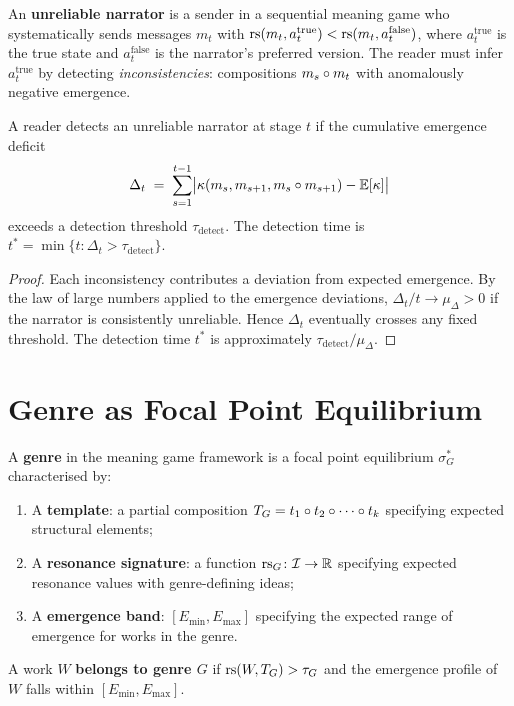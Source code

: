\begin{definition}
\label{def:unreliable}
An \textbf{unreliable narrator} is a sender in a sequential
meaning game who systematically sends messages $m_t$ with
$\mathrm{rs}(m_t, a_t^{\mathrm{true}}) < \mathrm{rs}(m_t, a_t^{\mathrm{false}})$,
where $a_t^{\mathrm{true}}$ is the true state and $a_t^{\mathrm{false}}$
is the narrator's preferred version.  The reader must infer
$a_t^{\mathrm{true}}$ by detecting \emph{inconsistencies}:
compositions $m_s \circ m_t$ with anomalously negative emergence.
\end{definition}

\begin{proposition}
\label{prop:unreliable-detection}
A reader detects an unreliable narrator at stage $t$ if
the cumulative emergence deficit
\[
  \Delta_t \;=\; \sum_{s=1}^{t-1} \bigl|
  \kappa(m_s, m_{s+1}, m_s \circ m_{s+1})
  - \mathbb{E}[\kappa]\bigr|
\]
exceeds a detection threshold $\tau_{\mathrm{detect}}$.  The
detection time is $t^* = \min\{t : \Delta_t > \tau_{\mathrm{detect}}\}$.
\end{proposition}

\begin{proof}
Each inconsistency contributes a deviation from expected emergence.
By the law of large numbers applied to the emergence deviations,
$\Delta_t / t \to \mu_\Delta > 0$ if the narrator is consistently
unreliable.  Hence $\Delta_t$ eventually crosses any fixed threshold.
The detection time $t^*$ is approximately
$\tau_{\mathrm{detect}} / \mu_\Delta$.
\end{proof}

\section{Genre as Focal Point Equilibrium}
\label{sec:genre}

\begin{definition}[Genre]
\label{def:genre}
A \textbf{genre} in the meaning game framework is a focal point
equilibrium $\sigma^*_G$ characterised by:
\begin{enumerate}[label=(\roman*)]
  \item A \textbf{template}: a partial composition
    $T_G = t_1 \circ t_2 \circ \cdots \circ t_k$ specifying
    expected structural elements;
  \item A \textbf{resonance signature}: a function $\mathrm{rs}_G \colon \mathcal{I} \to \mathbb{R}$
    specifying expected resonance values with genre-defining ideas;
  \item A \textbf{emergence band}: $[E_{\min}, E_{\max}]$ specifying
    the expected range of emergence for works in the genre.
\end{enumerate}
A work $W$ \textbf{belongs to genre $G$} if
$\mathrm{rs}(W, T_G) > \tau_G$ and the emergence profile of $W$ falls
within $[E_{\min}, E_{\max}]$.
\end{definition}

